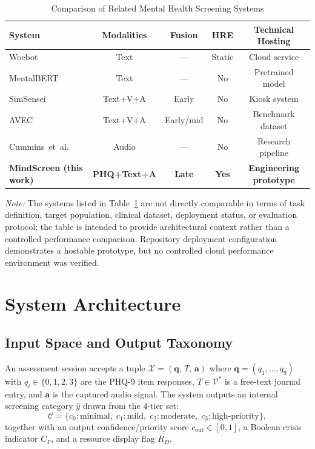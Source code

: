 \documentclass[10pt, conference, letterpaper]{IEEEtran}
\begin{document}
\begin{table}[!t]
\caption{Comparison of Related Mental Health Screening Systems}
\label{tab:related}
\centering
\footnotesize
\setlength{\tabcolsep}{8pt}
\begin{tabular}{@{}lcccc@{}}
\toprule
\textbf{System} & \textbf{Modalities}
  & \textbf{Fusion} & \textbf{HRE} & \textbf{Technical Hosting} \\
\midrule
Woebot~\cite{fitzpatrick2017}        & Text       & —          & Static & Cloud service \\
MentalBERT~\cite{ji2022}             & Text       & —          & No     & Pretrained model \\
SimSensei~\cite{devault2014}         & Text+V+A   & Early      & No     & Kiosk system \\
AVEC~\cite{ringeval2019}             & Text+V+A   & Early/mid  & No     & Benchmark dataset \\
Cummins~et~al.~\cite{cummins2015}   & Audio      & —          & No     & Research pipeline \\
\textbf{MindScreen (this work)}      & \textbf{PHQ+Text+A} & \textbf{Late} & \textbf{Yes} & \textbf{Engineering prototype} \\
\bottomrule
\end{tabular}
\vspace{1ex}

\parbox{0.90\textwidth}{\footnotesize \textit{Note:} The systems listed in
Table~\ref{tab:related} are not directly comparable in terms of task definition,
target population, clinical dataset, deployment status, or evaluation protocol;
the table is intended to provide architectural context rather than a controlled
performance comparison. Repository deployment configuration demonstrates a
hostable prototype, but no controlled cloud performance environment was verified.}
\end{table}

\section{System Architecture}
\label{sec:method}

\subsection{Input Space and Output Taxonomy}

An assessment session accepts a tuple
$\mathcal{X} = (\mathbf{q},\, T,\, \mathbf{a})$ where
$\mathbf{q} = (q_1, \dots, q_9)$ with $q_i \in \{0,1,2,3\}$ are the PHQ-9 item
responses, $T \in \mathcal{V}^*$ is a free-text journal entry, and
$\mathbf{a}$ is the captured audio signal.
The system outputs an internal screening category $\hat{y}$ drawn from the
4-tier set:
\begin{equation}
  \mathcal{C} = \{c_0\!:\!\text{minimal},\;c_1\!:\!\text{mild},\;
                  c_2\!:\!\text{moderate},\;c_3\!:\!\text{high-priority}\},
  \label{eq:label_space}
\end{equation}
together with an output confidence/priority score $c_{\text{out}} \in [0,1]$, a
Boolean crisis indicator $C_F$, and a resource display flag $R_D$.
\end{document}
